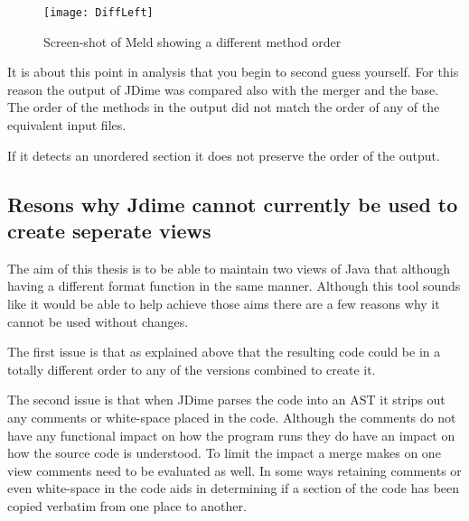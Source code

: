 \begin{figure}[h]
\begin{center}
\texttt{[image: DiffLeft]}
\end{center}
 \caption{Screen-shot of Meld showing a different method order}
\end{figure}

It is about this point in analysis that you begin to second guess yourself.  For this reason the output of JDime was compared also with the merger and the base.  The order of the methods in the output did not match the order of any of the equivalent input files.  

If it detects an unordered section it does not preserve the order of the output.

\subsection{Resons why Jdime cannot currently be used to create seperate views}
The aim of this thesis is to be able to maintain two views of Java that although having a different format function in the same manner.  Although this tool sounds like it would be able to help achieve those aims there are a few reasons why it cannot be used without changes.

The first issue is that as explained above that the resulting code could be in a totally different order to any of the versions combined to create it.

The second issue is that when JDime parses the code into an AST it strips out any comments or white-space placed in the code.  Although the comments do not have any functional impact on how the program runs they do have an impact on how the source code is understood.  To limit the impact a merge makes on one view comments need to be evaluated as well. In some ways retaining comments or even white-space in the code aids in determining if a section of the code has been copied verbatim from one place to another.

